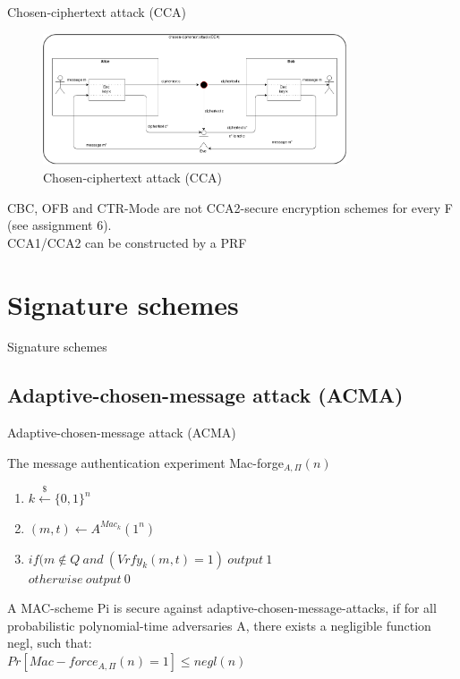 \documentclass[ucs,9pt]{beamer}
\begin{document}
\begin{frame}{Chosen-ciphertext attack (CCA)}
    
    \begin{figure}[h]
        \centering
        \includegraphics[width=0.8\textwidth]{figures/CCA.png}
        \caption{Chosen-ciphertext attack (CCA)}
    \end{figure}
    CBC, OFB and CTR-Mode are not CCA2-secure encryption schemes for every F (see assignment 6).\\
    CCA1/CCA2 can be constructed by a PRF\\
\end{frame}


%
%
\section{Signature schemes}

\begin{frame}
    \centering
    \huge{Signature schemes}
\end{frame}

\subsection{Adaptive-chosen-message attack (ACMA)}

\begin{frame}{Adaptive-chosen-message attack (ACMA)}
    \begin{block}{The message authentication experiment Mac-forge$_{A,\Pi}(n)$}
        \begin{enumerate}
            \item $k \overset{\$}{\leftarrow} \{0,1\}^n$
            \item $(m, t) \leftarrow A^{Mac_{k}}(1^{n})$
            \item $if(m \notin Q\ and\ (Vrfy_{k}(m, t) = 1)\ output\ 1$\\
            $otherwise\ output\ 0$
        \end{enumerate}
        
        A MAC-scheme Pi is secure against adaptive-chosen-message-attacks, if for all probabilistic polynomial-time adversaries A, there exists a negligible function negl, such that:\\
        $Pr[Mac-force_{A,\Pi}(n) = 1] \leq negl(n)$
    \end{block}
\end{frame}
\end{document}
